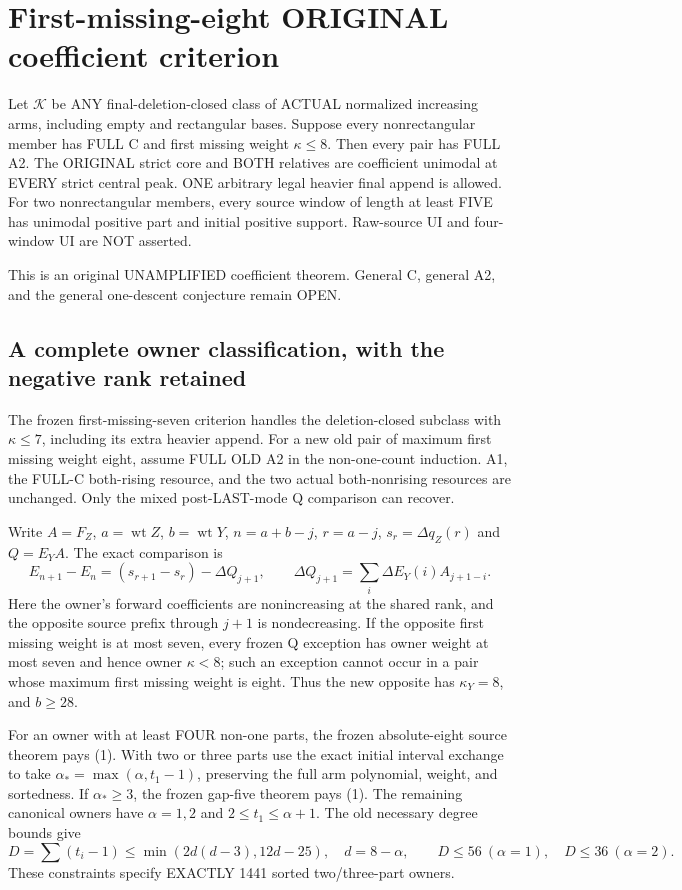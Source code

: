 \section{First-missing-eight ORIGINAL coefficient criterion}
\begin{theorem}
Let $\mathcal K$ be ANY final-deletion-closed class of ACTUAL
normalized increasing arms, including empty and rectangular bases.
Suppose every nonrectangular member has FULL C and first missing
weight $\kappa\le8$. Then every pair has FULL A2. The ORIGINAL
strict core and BOTH relatives are coefficient unimodal at EVERY
strict central peak. ONE arbitrary legal heavier final append is
allowed. For two nonrectangular members, every source window of
length at least FIVE has unimodal positive part and initial positive
support. Raw-source UI and four-window UI are NOT asserted.
\end{theorem}
This is an original UNAMPLIFIED coefficient theorem. General C,
general A2, and the general one-descent conjecture remain OPEN.

\subsection{A complete owner classification, with the negative rank retained}
The frozen first-missing-seven criterion handles the deletion-closed
subclass with $\kappa\le7$, including its extra heavier append.
For a new old pair of maximum first missing weight eight, assume
FULL OLD A2 in the non-one-count induction. A1, the FULL-C both-rising
resource, and the two actual both-nonrising resources are unchanged.
Only the mixed post-LAST-mode Q comparison can recover.

Write $A=F_Z$, $a=\operatorname{wt}Z$, $b=\operatorname{wt}Y$,
$n=a+b-j$, $r=a-j$, $s_r=\Delta q_Z(r)$ and $Q=E_YA$.
The exact comparison is
\[
 E_{n+1}-E_n=(s_{r+1}-s_r)-\Delta Q_{j+1},\qquad
 \Delta Q_{j+1}=\sum_i\Delta E_Y(i)A_{j+1-i}.          \tag{1}
\]
Here the owner's forward coefficients are nonincreasing at the
shared rank, and the opposite source prefix through $j+1$ is
nondecreasing. If the opposite first missing weight is at most
seven, every frozen Q exception has owner weight at most seven
and hence owner $\kappa<8$; such an exception cannot occur in a pair
whose maximum first missing weight is eight. Thus the new opposite
has $\kappa_Y=8$, and $b\ge28$.

For an owner with at least FOUR non-one parts, the frozen absolute-eight
source theorem pays (1). With two or three parts use the exact initial
interval exchange to take $\alpha_* =\max(\alpha,t_1-1)$, preserving
the full arm polynomial, weight, and sortedness. If $\alpha_*\ge3$,
the frozen gap-five theorem pays (1). The remaining canonical owners
have $\alpha=1,2$ and $2\le t_1\le\alpha+1$.
The old necessary degree bounds give
\[
 D=\sum(t_i-1)\le\min(2d(d-3),12d-25),\quad d=8-\alpha,
 \qquad D\le56\ (\alpha=1),\quad D\le36\ (\alpha=2).   \tag{2}
\]
These constraints specify EXACTLY 1441 sorted two/three-part owners.

